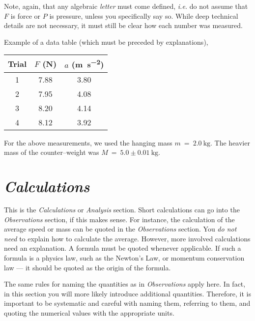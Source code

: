 \documentclass[epsfig,12pt]{article}
\begin{document}
	Note, again, that any algebraic \emph{letter} must come defined, \emph{i.e.} do not assume that $ F $ is force or $ P $ is pressure,
	unless you specifically say so.
	While deep technical details are not necessary, it must still be clear how each number was measured.
	
	Example of a data table (which must be preceded by explanations),
\begin{center}
\begin{tabular}{ccc}
%
\toprule
%
	Trial	&	$ F $ (\si{\newton})	&	$ a $ (\si{\metre\per\square\second})	\\[2mm]
%
\midrule
%
	1	&	7.88	&	3.80	\\[2mm]
	2	&	7.95	&	4.08	\\[2mm]
	3	&	8.20	&	4.14	\\[2mm]
	4	&	8.12	&	3.92	\\[2mm]
%
\bottomrule
\end{tabular}
\end{center}
	For the above measurements, we used the hanging mass $ m ~=~ \SI{2.0}{\kg} $.
	The heavier mass of the counter--weight was $ M ~=~ 5.0 \pm \SI{0.01}{\kg} $.


\section*{\textit{Calculations}}

	This is the \textit{Calculations} or \textit{Analysis} section.
	Short calculations can go into the \textit{Observations} section, if this makes sense.
	For instance, the calculation of the average speed or mass can be quoted
	in the \textit{Observations} section.
	You \emph{do not need} to explain how to calculate the average.
	However, more involved calculations need an explanation.
	A formula must be quoted whenever applicable.
	If such a formula is a physics law, such as the Newton's Law, or momentum conservation law ---
	it should be quoted as the origin of the formula.

	The same rules for naming the quantities as in \emph{Observations} apply here.
	In fact, in this section you will more likely introduce additional quantities.
	Therefore, it is important to be systematic and careful with naming them,
	referring to them, and quoting the numerical values with the appropriate units.
\end{document}
